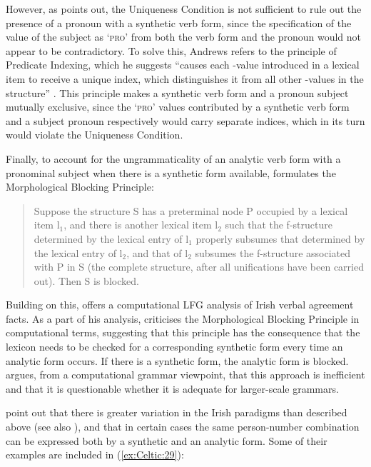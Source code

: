 \documentclass[output=paper,colorlinks,citecolor=brown]{langscibook}
\begin{document}
However, as \citet[516]{Andrews90} points out, the Uniqueness Condition is not sufficient to rule out the presence of a pronoun with a synthetic verb form, since the specification of the \PRED value of the subject as `\textsc{pro}' from both the verb form and the pronoun would not appear to be contradictory. To solve this, Andrews refers to the principle of Predicate Indexing, which he suggests ``causes each \PRED-value introduced in a lexical item to receive a unique index, which distinguishes it from all other \PRED-values in the structure'' \citep[516]{Andrews90}. This principle makes a synthetic verb form and a pronoun subject mutually exclusive, since the \textsc{`pro'} values contributed by a synthetic verb form and a subject pronoun respectively would carry separate indices, which in its turn would violate the Uniqueness Condition.

Finally, to account for the ungrammaticality of an analytic verb form with a pronominal subject when there is a synthetic form available, \citet{Andrews90} formulates the Morphological Blocking Principle:
\begin{quote}
Suppose the structure S has a preterminal node P occupied by a lexical item l$_1$, and there is another lexical item l$_2$ such that the f-structure determined by the lexical entry of l$_1$ properly subsumes that determined by the lexical entry of l$_2$, and that of l$_2$ subsumes the f-structure associated with P in S (the complete structure, after all unifications have been carried out). Then S is blocked.  \citep[519]{Andrews90}
\end{quote}
Building on this, \citet{Sulger2010} offers a computational LFG analysis of Irish verbal agreement facts. As a part of his analysis, \citet[169--170]{Sulger2010} criticises the Morphological Blocking Principle in computational terms, suggesting that this principle has the consequence that the lexicon needs to be checked for a corresponding synthetic form every time an analytic form occurs. If there is a synthetic form, the analytic form is blocked. \citet[170]{Sulger2010} argues, from a computational grammar viewpoint, that this approach is inefficient and that it is questionable whether it is adequate for larger-scale grammars.

\citet[491--492 and {\textsection}6]{McCloskeyHale1984} point out that there is greater variation in the Irish paradigms than described above (see also \citealt[182--185]{OSiadhail1989}), and that in certain cases the same person-number combination can be expressed both by a synthetic and an analytic form. Some of their examples are included in (\ref{ex:Celtic:29}):
\end{document}
